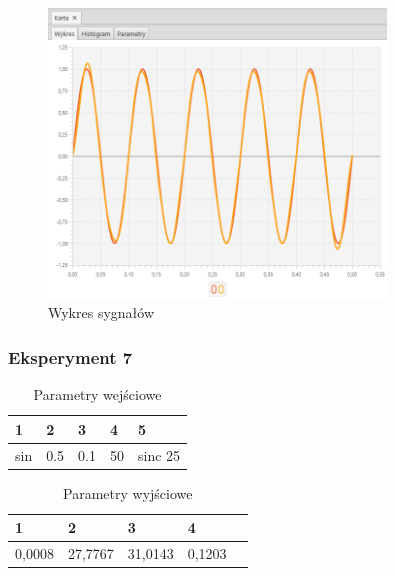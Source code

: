 \documentclass[12pt]{article}
\begin{document}
{{{                \begin{figure}[H]
                    \centering
                    \includegraphics[width=0.8\textwidth]{img/result/experiment4/06/data_draw_original_chart_recon_output_130644.png}
                    \caption{Wykres sygnałów}
                \end{figure}
            }
            \newpage

            \subsubsection{Eksperyment 7} {
                \begin{table}[H]
                    \centering
                    \begin{tabular}{|l|l|l|l|l|}
                        \hline
                        1 & 2 & 3 & 4 & 5   \\ \hline
                        sin & 0.5 & 0.1 & 50 & sinc 25  \\ \hline
                    \end{tabular}
                    \caption{Parametry wejściowe}
                \end{table}

                \begin{table}[H]
                    \centering
                    \begin{tabular}{|l|l|l|l|l|}
                        \hline
                        1 & 2 & 3 & 4   \\ \hline
                        0,0008 & 27,7767 & 31,0143 & 0,1203 \\ \hline
                    \end{tabular}
                    \caption{Parametry wyjściowe}
                \end{table}


}}}
\end{document}

